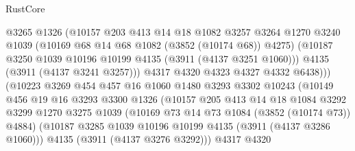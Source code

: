\begin{lexlean}{RustCore}
\begin{coremodule}
                                @3265
                                @1326
                                (@10157
                                  @203
                                  @413
                                  @14
                                  @18
                                  @1082
                                  @3257
                                  @3264
                                  @1270
                                  @3240
                                  @1039
                                  (@10169 @68 @14 @68 @1082 (@3852 (@10174 @68)) @4275)
                                  (@10187
                                    @3250
                                    @1039
                                    @10196
                                    @10199
                                    @4135
                                    (@3911 (@4137 @3251 @1060)))
                                  @4135
                                  (@3911 (@4137 @3241 @3257)))
                                @4317
                                @4320
                                @4323
                                @4327
                                @4332
                                @6438)))
                          (@10223
                            @3269
                            @454
                            @457
                            @16
                            @1060
                            @1480
                            @3293
                            @3302
                            @10243
                            (@10149
                              @456
                              @19
                              @16
                              @3293
                              @3300
                              @1326
                              (@10157
                                @205
                                @413
                                @14
                                @18
                                @1084
                                @3292
                                @3299
                                @1270
                                @3275
                                @1039
                                (@10169 @73 @14 @73 @1084 (@3852 (@10174 @73)) @4884)
                                (@10187 @3285 @1039 @10196 @10199 @4135 (@3911 (@4137 @3286 @1060)))
                                @4135
                                (@3911 (@4137 @3276 @3292)))
                              @4317
                              @4320

\end{coremodule}
\end{lexlean}
